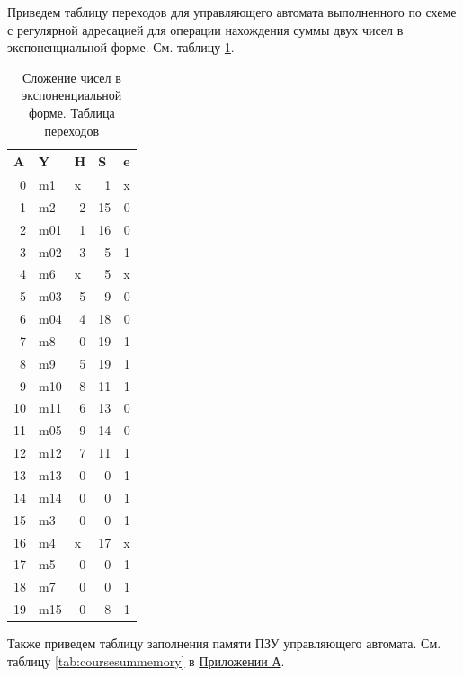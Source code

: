 \documentclass[a4paper,14pt]{extarticle}
\begin{document}
	Приведем таблицу переходов для управляющего автомата выполненного по схеме с регулярной адресацией для операции нахождения суммы двух чисел в экспоненциальной форме. См. таблицу \ref{tab:coursesumsteps}.
\begin{table}[h!]
	\small
	\centering
	\begin{tabular}{|r||l|r|r|r|}
		\hline
		\multicolumn{1}{|l||}{\textbf{A}} & \textbf{Y} & \multicolumn{1}{l|}{\textbf{H}} & \multicolumn{1}{l|}{\textbf{S}} & \multicolumn{1}{l|}{\textbf{e}} \\ \hline
		0 & m1 & \multicolumn{1}{l|}{x} & 1 & \multicolumn{1}{l|}{x} \\ \hline
		1 & m2 & 2 & 15 & 0 \\ \hline
		2 & m01 & 1 & 16 & 0 \\ \hline
		3 & m02 & 3 & 5 & 1 \\ \hline
		4 & m6 & \multicolumn{1}{l|}{x} & 5 & \multicolumn{1}{l|}{x} \\ \hline
		5 & m03 & 5 & 9 & 0 \\ \hline
		6 & m04 & 4 & 18 & 0 \\ \hline
		7 & m8 & 0 & 19 & 1 \\ \hline
		8 & m9 & 5 & 19 & 1 \\ \hline
		9 & m10 & 8 & 11 & 1 \\ \hline
		10 & m11 & 6 & 13 & 0 \\ \hline
		11 & m05 & 9 & 14 & 0 \\ \hline
		12 & m12 & 7 & 11 & 1 \\ \hline
		13 & m13 & 0 & 0 & 1 \\ \hline
		14 & m14 & 0 & 0 & 1 \\ \hline
		15 & m3 & 0 & 0 & 1 \\ \hline
		16 & m4 & \multicolumn{1}{l|}{x} & 17 & \multicolumn{1}{l|}{x} \\ \hline
		17 & m5 & 0 & 0 & 1 \\ \hline
		18 & m7 & 0 & 0 & 1 \\ \hline
		19 & m15 & 0 & 8 & 1 \\ \hline
	\end{tabular}
	\caption{Сложение чисел в экспоненциальной форме. Таблица переходов}
	\label{tab:coursesumsteps}
\end{table}

Также приведем таблицу заполнения памяти ПЗУ управляющего автомата. См. таблицу \ref{tab:coursesummemory} в \hyperref[tam]{Приложении А}.
\end{document}
